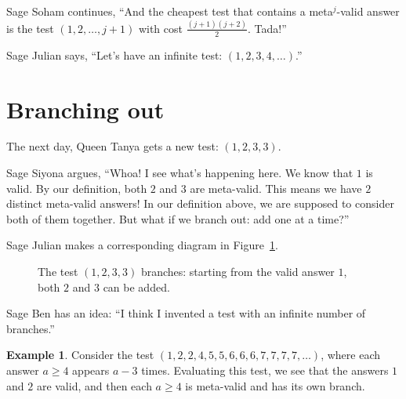 \documentclass[12pt,reqno]{article}
\theoremstyle{plain}
\theoremstyle{definition}
\newtheorem{example}{Example}
\theoremstyle{remark}
\begin{document}
Sage Soham continues, ``And the cheapest test that contains a meta$^j$-valid answer is the test $(1,2,\dots,j+1)$ with cost $\frac{(j+1)(j+2)}{2}$. Tada!''

Sage Julian says, ``Let's have an infinite test: $(1,2,3,4,\dots)$.''


\section*{Branching out}

The next day, Queen Tanya gets a new test: $(1, 2, 3, 3)$.

Sage Siyona argues, ``Whoa! I see what's happening here. We know that $1$ is valid. By our definition, both $2$ and $3$ are meta-valid. This means we have $2$ distinct meta-valid answers! In our definition above, we are supposed to consider both of them together. But what if we branch out: add one at a time?''

Sage Julian makes a corresponding diagram in Figure~\ref{fig:branching-process}.
\begin{figure}[ht!] \centering 
{}
\caption{The test $(1,2,3,3)$ branches: starting from the valid answer $1$, both $2$ and $3$ can be added.} \label{fig:branching-process}
\end{figure}

Sage Ben has an idea: ``I think I invented a test with an infinite number of branches.''

\begin{example}
Consider the test $(1, 2, 2, 4, 5, 5, 6, 6, 6, 7, 7, 7, 7, \dots)$, where each answer $a\geq 4$ appears $a-3$ times. Evaluating this test, we see that the answers $1$ and $2$ are valid, and then each $a\geq 4$ is meta-valid and has its own branch.  
\end{example}
\end{document}

